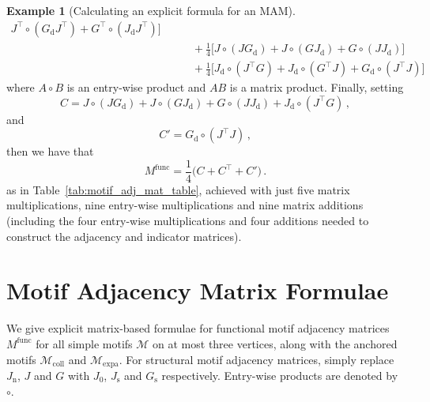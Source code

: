 \documentclass[12pt]{ociamthesis}
\theoremstyle{plain}
\theoremstyle{definition}
\newtheorem{example}{Example}[chapter]
\theoremstyle{remark}
\newcommand\ca[1]{\mathcal{#1}}
\begin{document}
\begin{example}[Calculating an explicit formula for an MAM]
\begin{align*}
J^\top \circ (G_\mathrm{d} J^\top) + G^\top \circ (J_\mathrm{d} J^\top)
\Big] \\
& \qquad + \frac{1}{4} \Big[ J \circ (J G_\mathrm{d}) + J \circ (G
J_\mathrm{d}) + G \circ (J J_\mathrm{d}) \Big] \\
& \qquad + \frac{1}{4} \Big[ J_\mathrm{d} \circ (J^\top G) + J_\mathrm{d}
\circ (G^\top J) + G_\mathrm{d} \circ (J^\top J) \Big]
\end{align*}
%
where $A \circ B$ is an entry-wise product and $AB$ is a matrix product.
Finally, setting
$$C = J \circ (J G_\mathrm{d}) + J \circ (G J_\mathrm{d}) + G \circ (J
J_\mathrm{d}) + J_\mathrm{d} \circ (J^\top G)\,, $$
and
$$ C' = G_\mathrm{d} \circ (J^\top J)\,, $$
then we have that
$$ M^\mathrm{func} = \frac{1}{4} \big(C + C^\top + C' \big)\,. $$
as in Table~\ref{tab:motif_adj_mat_table}, achieved with just five matrix
multiplications, nine entry-wise multiplications and nine matrix additions
(including the four entry-wise multiplications and four additions needed to
construct the adjacency and indicator matrices).
\end{example}
\clearpage{}
\clearpage{}
\chapter{Motif Adjacency Matrix Formulae}
\label{chap:appendix_matrices}

We give explicit matrix-based formulae for functional motif adjacency matrices
$M^\mathrm{func}$ for all simple motifs $\ca{M}$ on at most three vertices,
along with the anchored motifs $\ca{M}_\mathrm{coll}$ and
$\ca{M}_\mathrm{expa}$. For structural motif adjacency matrices, simply replace
$J_\mathrm{n}$, $J$ and $G$ with $J_0$, $J_\mathrm{s}$ and $G_\mathrm{s}$
respectively. Entry-wise products are denoted by $\circ$.
\end{document}
